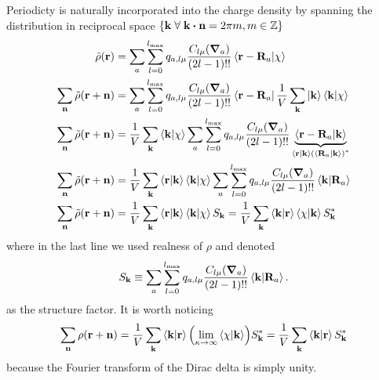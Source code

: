 \documentclass[12pt]{extarticle}
\renewcommand{\bf}{\mathbf}
\begin{document}
    Periodicty is naturally incorporated into the charge density by spanning the distribution in reciprocal space \(\qty{ \bf k\; \forall\; \bf k \dotproduct \bf n = 2 \pi m, m \in \mathbb{Z}}\) 
    \begin{align*}
        \tilde{\rho} ( \bf r) &=  \sum_{a} \sum_{l = 0}^{l_{\max}} q_{a, l \mu} \frac{C_{l \mu} (\grad_a)}{(2l - 1)!!} \bra{\bf r - \bf R_a} \ket{\chi } \\
        \sum_{\bf n} \tilde{\rho} ( \bf r + \bf n) &=  \sum_{a} \sum_{l = 0}^{l_{\max}} q_{a, l \mu} \frac{C_{l \mu} (\grad_a)}{(2l - 1)!!} \bra{\bf r - \bf R_a} \frac{1}{V}\sum_{\bf k} \ket{\bf k} \bra{\bf k}  \ket{\chi } \\
        \sum_{\bf n} \tilde{\rho} ( \bf r + \bf n) &= \frac{1}{V}\sum_{\bf k}  \bra{\bf k}  \ket{\chi }  \sum_{a} \sum_{l = 0}^{l_{\max}} q_{a, l \mu} \frac{C_{l \mu} (\grad_a)}{(2l - 1)!!} \underbrace{\bra{\bf r - \bf R_a} \ket{\bf k}}_{\bra{\bf r} \ket{\bf k} \pqty{\bra{\bf R_a} \ket{\bf k} }^*  } \\
        \sum_{\bf n} \tilde{\rho} ( \bf r + \bf n) &= \frac{1}{V}\sum_{\bf k} \bra{\bf r} \ket{\bf k}  \bra{\bf k}  \ket{\chi }  \sum_{a} \sum_{l = 0}^{l_{\max}} q_{a, l \mu} \frac{C_{l \mu} (\grad_a)}{(2l - 1)!!} \bra{\bf k} \ket{\bf R_a}\\
        \sum_{\bf n} \tilde{\rho} ( \bf r + \bf n) &= \frac{1}{V}\sum_{\bf k} \bra{\bf r} \ket{\bf k}  \bra{\bf k}  \ket{\chi }  S_{\bf k} = \frac{1}{V}\sum_{\bf k} \bra{\bf k} \ket{\bf r}\bra{\chi }\ket{\bf k}  S_{\bf k}^*
    \end{align*}
    where in the last line we used realness of \(\rho\) and denoted \begin{equation}
        S_{\bf k} \equiv \sum_{a} \sum_{l = 0}^{l_{\max}} q_{a, l \mu} \frac{C_{l \mu} (\grad_a)}{(2l - 1)!!} \bra{\bf k} \ket{\bf R_a}. \label{eq:esf}
    \end{equation}
    as the structure factor. It is worth noticing \[
        \sum_{\bf n} \rho( \bf r + \bf n) = \frac{1}{V}\sum_{\bf k} \bra{\bf k} \ket{\bf r}\pqty{ \lim_{\kappa \to \infty} \bra{\chi }\ket{\bf k}}  S_{\bf k}^* = \frac{1}{V}\sum_{\bf k} \bra{\bf k} \ket{\bf r} S_{\bf k}^*
    \]
    because the Fourier transform of the Dirac delta is simply unity.
\end{document}
